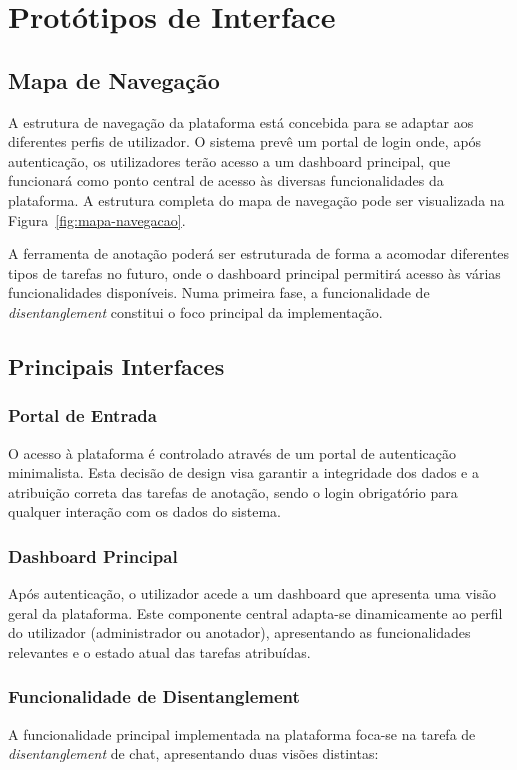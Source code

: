 \section{Protótipos de Interface}

\subsection{Mapa de Navegação}

A estrutura de navegação da plataforma está concebida para se adaptar aos diferentes perfis de utilizador. O sistema prevê um portal de login onde, após autenticação, os utilizadores terão acesso a um dashboard principal, que funcionará como ponto central de acesso às diversas funcionalidades da plataforma. A estrutura completa do mapa de navegação pode ser visualizada na Figura~\ref{fig:mapa-navegacao}.

A ferramenta de anotação poderá ser estruturada de forma a acomodar diferentes tipos de tarefas no futuro, onde o dashboard principal permitirá acesso às várias funcionalidades disponíveis. Numa primeira fase, a funcionalidade de \textit{disentanglement} constitui o foco principal da implementação.

\subsection{Principais Interfaces}

\subsubsection{Portal de Entrada}
O acesso à plataforma é controlado através de um portal de autenticação minimalista. Esta decisão de design visa garantir a integridade dos dados e a atribuição correta das tarefas de anotação, sendo o login obrigatório para qualquer interação com os dados do sistema.

\subsubsection{Dashboard Principal}
Após autenticação, o utilizador acede a um dashboard que apresenta uma visão geral da plataforma. Este componente central adapta-se dinamicamente ao perfil do utilizador (administrador ou anotador), apresentando as funcionalidades relevantes e o estado atual das tarefas atribuídas.

\subsubsection{Funcionalidade de Disentanglement}
A funcionalidade principal implementada na plataforma foca-se na tarefa de \textit{disentanglement} de chat, apresentando duas visões distintas:

